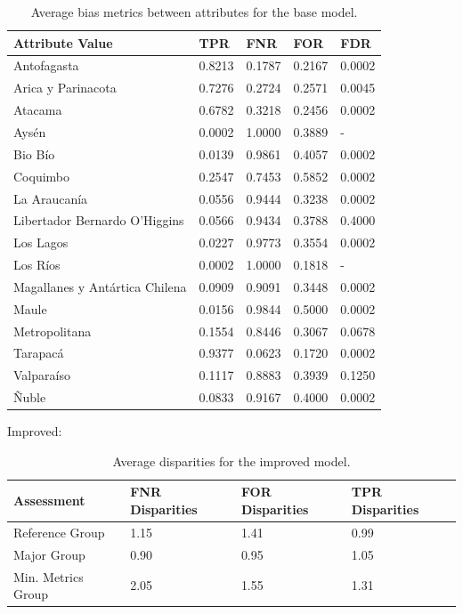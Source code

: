 \documentclass[fleqn,10pt]{wlscirep}
\begin{document}
\begin{table}[ht]
\centering
\begin{tabular}{|p{3.5cm}|p{1cm}|p{1cm}|p{1cm}|p{1cm}|}
\hline

               \textbf{Attribute Value} &    \textbf{TPR} &    \textbf{FNR} &    \textbf{FOR} &    \textbf{FDR} \\ \hline

                   Antofagasta & 0.8213 & 0.1787 & 0.2167 & 0.0002 \\
            Arica y Parinacota & 0.7276 & 0.2724 & 0.2571 & 0.0045 \\
                       Atacama & 0.6782 & 0.3218 & 0.2456 & 0.0002 \\
                         Aysén & 0.0002 & 1.0000 & 0.3889 &    - \\
                       Bio Bío & 0.0139 & 0.9861 & 0.4057 & 0.0002 \\
                      Coquimbo & 0.2547 & 0.7453 & 0.5852 & 0.0002 \\
                  La Araucanía & 0.0556 & 0.9444 & 0.3238 & 0.0002 \\
 Libertador Bernardo O'Higgins & 0.0566 & 0.9434 & 0.3788 & 0.4000 \\
                     Los Lagos & 0.0227 & 0.9773 & 0.3554 & 0.0002 \\
                      Los Ríos & 0.0002 & 1.0000 & 0.1818 &    - \\
Magallanes y Antártica Chilena & 0.0909 & 0.9091 & 0.3448 & 0.0002 \\
                         Maule & 0.0156 & 0.9844 & 0.5000 & 0.0002 \\
                 Metropolitana & 0.1554 & 0.8446 & 0.3067 & 0.0678 \\
                      Tarapacá & 0.9377 & 0.0623 & 0.1720 & 0.0002 \\
                    Valparaíso & 0.1117 & 0.8883 & 0.3939 & 0.1250 \\
                         Ñuble & 0.0833 & 0.9167 & 0.4000 & 0.0002 \\

\hline
\end{tabular}
\caption{Average bias metrics between attributes for the base model.}
\end{table}

Improved:

\begin{table}[!htb]
\centering
\begin{tabular}{|p{70pt}|p{2cm}|p{2cm}|p{2cm}|}
\hline
        \textbf{Assessment} & \textbf{FNR \break Disparities} & \textbf{FOR \break Disparities} & \textbf{TPR \break Disparities} \\ \hline
        Reference Group & 1.15 & 1.41 & 0.99   \\ 
        Major Group & 0.90 & 0.95 & 1.05  \\ 
        Min. Metrics Group & 2.05 & 1.55 & 1.31 \\ 
        \hline
    \end{tabular}
\caption{Average disparities for the improved model.}
\end{table}
\end{document}
